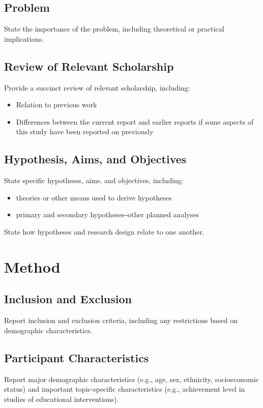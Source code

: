 \documentclass[acmsmall]{acmart}
\begin{document}
\subsection{Problem}

State the importance of the problem, including theoretical or practical implications.

\subsection{Review of Relevant Scholarship}

Provide a succinct review of relevant scholarship, including: 

\begin{itemize}
    \item Relation to previous work
    \item Differences between the current report and earlier reports if some aspects of this study have been reported on previously
\end{itemize}

\subsection{Hypothesis, Aims, and Objectives}

State specific hypotheses, aims, and objectives, including:
\begin{itemize}
    \item theories or other means used to derive hypotheses
    \item primary and secondary hypotheses‒other planned analyses
\end{itemize}

State how hypotheses and research design relate to one another.

\section{Method}

\subsection{Inclusion and Exclusion}
Report inclusion and exclusion criteria, including any restrictions based on demographic characteristics.

\subsection{Participant Characteristics}
Report major demographic characteristics (e.g., age, sex, ethnicity, socioeconomic status) and important topic-specific characteristics (e.g., achievement level in studies of educational interventions).
\end{document}
